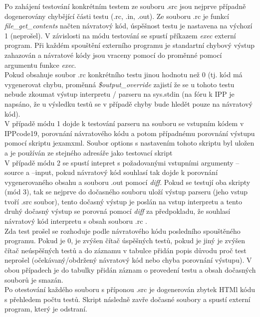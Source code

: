 \documentclass[10pt]{article}
\begin{document}
Po zahájení testování konkrétním testem ze souboru .src jsou nejprve případně dogenerovány chybějící části testu (.rc, .in, .out). Ze souboru .rc je funkcí  \textit{file\_get\_contents} načten návratový kód, úspěšnost testu je nastavena na výchozí 1 (neprošel). V závislosti na módu testování se spustí příkazem \textit{exec} externí program. Při každém spouštění externího programu je standartní chybový výstup zahazován a návratové kódy jsou vraceny pomocí do proměnné pomocí argumentu funkce \textit{exec}.\\
Pokud obsahuje soubor .rc konkrétního testu jinou hodnotu než 0 (tj. kód má vygenerovat chybu, proměnná \textit{\$output_override} zajistí že se u tohoto testu nebude zkoumat výstup interpretu / parseru na sys.stdin (na fóru k IPP je napsáno, že u výsledku testů se v případě chyby bude hledět pouze na návratový kód).
\\V případě módu 1 dojde k testování parseru na souboru se vstupním kódem v IPPcode19, porovnání návratového kódu a potom případnému porovnání výstupu pomocí skriptu jexamxml. Soubor options s nastavením tohoto skriptu byl uložen a je používán ze stejného adresáře jako testovací skript\\V případě módu 2 se spustí intepret s požadovanými vstupními argumenty --source a --input, pokud návratový kód souhlasí tak dojde k porovnání vygenerovaného obsahu a souboru .out pomocí \textit{diff}. Pokud se testují oba skripty (mód 3), tak se nejprve do dočasného souboru uloží výstup parseru (jeho vstup tvoří .src soubor), tento dočasný výstup je poslán na vstup interpretu a tento druhý dočasný výstup se porovná pomocí \textit{diff} za předpokladu, že souhlasí návratový kód interpretu s obsah souboru .rc .\\
Zda test prošel se rozhoduje podle návratového kódu posledního spouštěného programu. Pokud je 0, je zvýšen čítač úspěšných testů, pokud je jiný je zvýšen čítač neúspěšných testů a do záznamu v tabulce přidán popis důvodu proč test neprošel (očekávaný/obdržený návratový kód nebo chyba porovnání výstupu). V obou případech je do tabulky přidán záznam o provedení testu a obsah dočasných souborů je smazán.\\
Po otestování každého souboru s příponou .src je dogenerován zbytek HTMl kódu s přehledem počtu testů. Skript následně zavře dočasné soubory a spustí externí program, který je odstraní.
\end{document}
